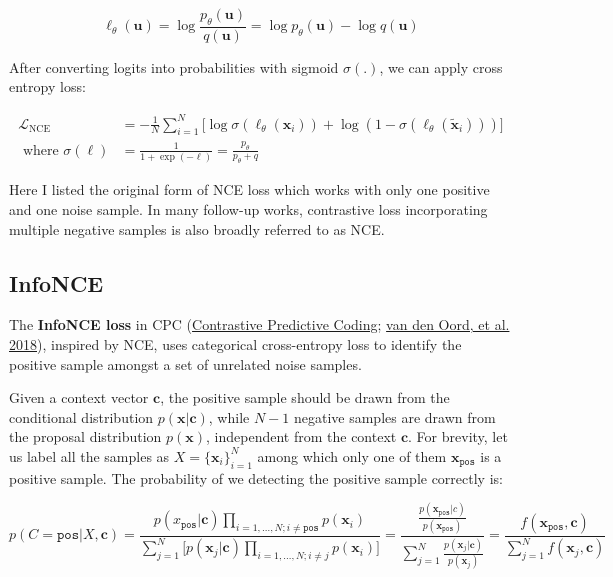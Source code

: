 \documentclass[12pt]{article}
\begin{document}
\[
\ell_\theta(\mathbf{u}) = \log \frac{p_\theta(\mathbf{u})}{q(\mathbf{u})} = \log p_\theta(\mathbf{u}) - \log q(\mathbf{u})
\]

After converting logits into probabilities with sigmoid $\sigma(.)$, we can apply cross entropy loss:

\[
\begin{aligned}
\mathcal{L}_\text{NCE} &= - \frac{1}{N} \sum_{i=1}^N \big[ \log \sigma (\ell_\theta(\mathbf{x}_i)) + \log (1 - \sigma (\ell_\theta(\tilde{\mathbf{x}}_i))) \big] \\
\text{ where }\sigma(\ell) &= \frac{1}{1 + \exp(-\ell)} = \frac{p_\theta}{p_\theta + q}
\end{aligned}
\]

Here I listed the original form of NCE loss which works with only one positive and one noise sample. In many follow-up works, contrastive loss incorporating multiple negative samples is also broadly referred to as NCE.

\subsection{InfoNCE}

The \textbf{InfoNCE loss} in CPC (\href{https://lilianweng.github.io/posts/2019-11-10-self-supervised/#contrastive-predictive-coding}{Contrastive Predictive Coding}; \href{https://arxiv.org/abs/1807.03748}{van den Oord, et al. 2018}), inspired by NCE, uses categorical cross-entropy loss to identify the positive sample amongst a set of unrelated noise samples.

Given a context vector $\mathbf{c}$, the positive sample should be drawn from the conditional distribution $p(\mathbf{x} \vert \mathbf{c})$, while $N-1$ negative samples are drawn from the proposal distribution $p(\mathbf{x})$, independent from the context $\mathbf{c}$. For brevity, let us label all the samples as $X=\{ \mathbf{x}_i \}^N_{i=1}$ among which only one of them $\mathbf{x}_\texttt{pos}$ is a positive sample. The probability of we detecting the positive sample correctly is:

\[
p(C=\texttt{pos} \vert X, \mathbf{c}) 
= \frac{p(x_\texttt{pos} \vert \mathbf{c}) \prod_{i=1,\dots,N; i \neq \texttt{pos}} p(\mathbf{x}_i)}{\sum_{j=1}^N \big[ p(\mathbf{x}_j \vert \mathbf{c}) \prod_{i=1,\dots,N; i \neq j} p(\mathbf{x}_i) \big]}
= \frac{ \frac{p(\mathbf{x}_\texttt{pos}\vert c)}{p(\mathbf{x}_\texttt{pos})} }{ \sum_{j=1}^N \frac{p(\mathbf{x}_j\vert \mathbf{c})}{p(\mathbf{x}_j)} }
= \frac{f(\mathbf{x}_\texttt{pos}, \mathbf{c})}{ \sum_{j=1}^N f(\mathbf{x}_j, \mathbf{c}) }
\]
\end{document}
